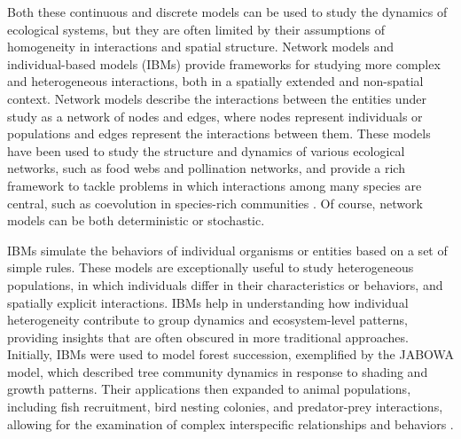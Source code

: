 Both these continuous and discrete models can be used to study the dynamics of
ecological systems, but they are often limited by their assumptions of
homogeneity in interactions and spatial structure. Network models and
individual-based models (IBMs) provide frameworks for studying more complex and
heterogeneous interactions, both in a spatially extended and non-spatial
context. Network models describe the interactions between the entities under
study as a network of nodes and edges, where nodes represent individuals or
populations and edges represent the interactions between them. These models
have been used to study the structure and dynamics of various ecological
networks, such as food webs and pollination networks, and provide a rich
framework to tackle problems in which interactions among many species are
central, such as coevolution in species-rich communities \cite{Bascompte2007}.
Of course, network models can be both deterministic or stochastic.

IBMs simulate the behaviors of individual organisms or entities based on a set
of simple rules. These models are exceptionally useful to study heterogeneous
populations, in which individuals differ in their characteristics or behaviors,
and spatially explicit interactions. IBMs help in understanding how individual
heterogeneity contribute to group dynamics and ecosystem-level patterns,
providing insights that are often obscured in more traditional approaches.
Initially, IBMs were used to model forest succession, exemplified by the JABOWA
model, which described tree community dynamics in response to shading and
growth patterns. Their applications then expanded to animal populations,
including fish recruitment, bird nesting colonies, and predator-prey
interactions, allowing for the examination of complex interspecific
relationships and behaviors \cite{deangelis2014}.

